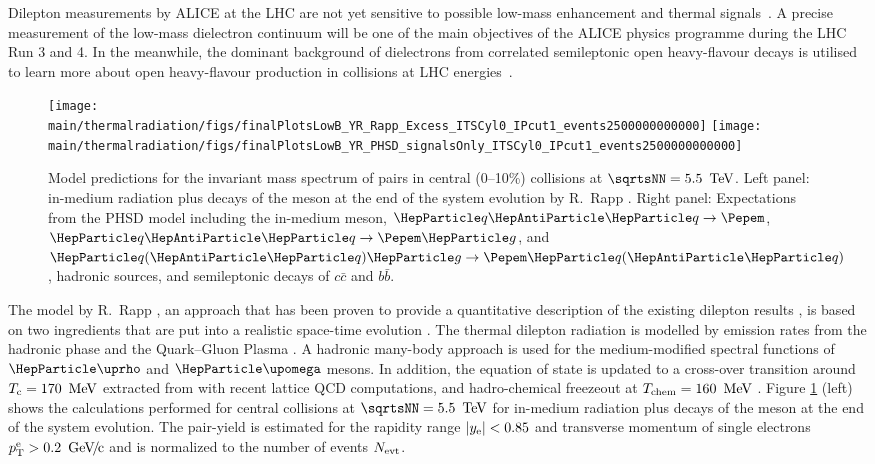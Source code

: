 \documentclass[../report.tex]{subfiles}
\providecommand{\main}{..}
\begin{document}
Dilepton measurements by ALICE at the LHC are not yet sensitive to possible low-mass enhancement and thermal signals~\cite{Acharya:2018nxm}. A precise measurement of the low-mass dielectron continuum will be one of the main objectives of the ALICE physics programme during the LHC Run 3 and 4. In the meanwhile, the dominant background of dielectrons from correlated semileptonic open heavy-flavour decays is utilised to learn more about open heavy-flavour production in \pp{} collisions at LHC energies~\cite{Acharya:2018ohw,Acharya:2018kkj}.


\begin{figure}[htb]
\centering
\texttt{[image: \\main/thermalradiation/figs/finalPlotsLowB\_YR\_Rapp\_Excess\_ITSCyl0\_IPcut1\_events2500000000000]}
\texttt{[image: \\main/thermalradiation/figs/finalPlotsLowB\_YR\_PHSD\_signalsOnly\_ITSCyl0\_IPcut1\_events2500000000000]}
\caption{Model predictions for the invariant mass spectrum of \Pepem pairs in central (0--10\%) \PbPb{} collisions at $\sqrtsNN = \unit[5.5]{\UTeV}$. Left panel: in-medium radiation plus decays of the \PGr meson at the end of the system evolution by R.~Rapp \etal. Right panel: Expectations from the PHSD model including the in-medium \PGr meson, $\PQq\PAQq\rightarrow\Pepem$, $\PQq\PAQq\rightarrow\Pepem\Pg$, and $\PQq(\PAQq)\Pg\rightarrow\Pepem\PQq(\PAQq)$, hadronic sources, and semileptonic decays of $c\bar{c}$ and $b\bar{b}$.}
\label{fig:LHCExpectations_Rapp_pHSD}
\end{figure}

The model by R.~Rapp \etal, an approach that has been proven to provide a quantitative description of the existing dilepton results \cite{Rapp:2011is}, is based on two ingredients that are put into a realistic space-time evolution \cite{Rapp:2000pe}. The thermal dilepton radiation is modelled by emission rates from the hadronic phase and the Quark--Gluon Plasma \cite{vanHees:2007th,Rapp:2009yu}. A hadronic many-body approach \cite{Rapp:1999us} is used for the medium-modified spectral functions of $\PGr$ and $\PGo$ mesons. In addition, the equation of state is updated to a cross-over transition around $T_{\rm c}=\unit[170]{\UMeV}$ extracted from with recent lattice QCD computations, and hadro-chemical freezeout at $T_{\rm chem}=\unit[160]{\UMeV}$ \cite{He:2011zx}. Figure \ref{fig:LHCExpectations_Rapp_pHSD} (left) shows the calculations performed for central \PbPb{} collisions at $\sqrtsNN = \unit[5.5]{\UTeV}$ for in-medium radiation plus decays of the \PGr meson at the end of the system evolution. The pair-yield is estimated for the rapidity range $|y_{\rm e}|<0.85$ and transverse momentum of single electrons $\pT^{\rm e}>\unit[0.2]{\UGeVc}$ and is normalized to the number of events $N_{\rm evt}$. 
 
\end{document}
